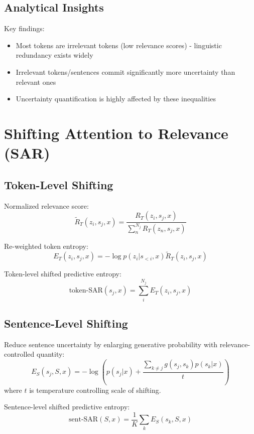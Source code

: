 \subsection{Analytical Insights}
Key findings:
\begin{itemize}
\item Most tokens are irrelevant tokens (low relevance scores) - linguistic redundancy exists widely
\item Irrelevant tokens/sentences commit significantly more uncertainty than relevant ones
\item Uncertainty quantification is highly affected by these inequalities
\end{itemize}

\section{Shifting Attention to Relevance (SAR)}

\subsection{Token-Level Shifting}
Normalized relevance score:
\begin{equation}
\tilde{R}_T(z_i, s_j, x) = \frac{R_T(z_i, s_j, x)}{\sum_n^{N_j}{R_T(z_n, s_j, x)}}
\end{equation}

Re-weighted token entropy:
\begin{equation}
E_T(z_i, s_j, x) = -\log p(z_i|s_{<i}, x) \tilde{R}_T(z_i, s_j, x)
\end{equation}

Token-level shifted predictive entropy:
\begin{equation}
\text{token-SAR}(s_j, x) = \sum_i^{N_j}{E_T(z_i, s_j, x)}
\end{equation}

\subsection{Sentence-Level Shifting}
Reduce sentence uncertainty by enlarging generative probability with relevance-controlled quantity:
\begin{equation}
E_S(s_j, S, x) = -\log(p(s_j|x) + \frac{\sum_{k \neq j}{g(s_j, s_k)p(s_k|x)}}{t})
\end{equation}
where $t$ is temperature controlling scale of shifting.

Sentence-level shifted predictive entropy:
\begin{equation}
\text{sent-SAR}(S, x) = \frac{1}{K}\sum_k{E_S(s_k, S, x)}
\end{equation}


